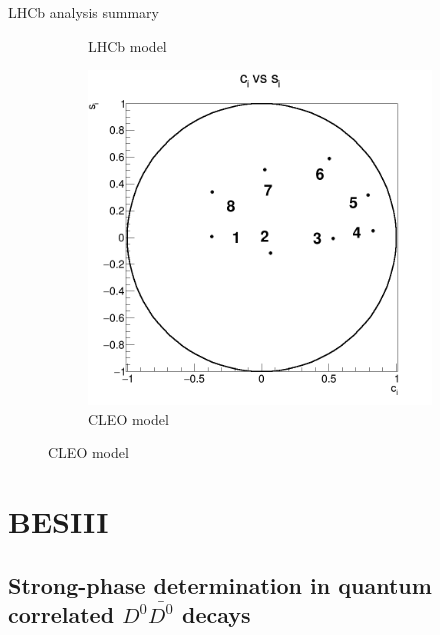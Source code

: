 \documentclass{beamer}
\begin{document}
\begin{frame}{LHCb analysis summary}
\begin{figure}
\begin{subfigure}{0.30\textwidth}
      \caption{LHCb model}
    \end{subfigure}%
    \begin{subfigure}{0.30\textwidth}
      \includegraphics[width = 1.0\textwidth]{Plots/StrongPhaseParametersPlot_Mint2_cisi_8Bins.png}
      \caption{CLEO model}
    \end{subfigure}
  \end{figure}
\end{frame}

\section{BESIII}
\subsection{Strong-phase determination in quantum correlated \texorpdfstring{$D^0\bar{D^0}$}{D0D0} decays}
\end{document}
